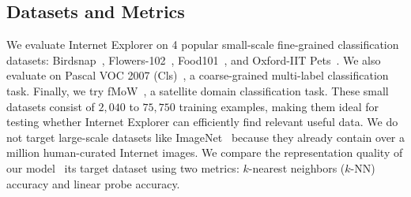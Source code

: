 \subsection{Datasets and Metrics}
We evaluate Internet Explorer on 4 popular small-scale fine-grained classification datasets: Birdsnap~\cite{berg2014birdsnap}, Flowers-102~\cite{nilsback2008automated}, Food101~\cite{bossard2014food}, and Oxford-IIT Pets~\cite{parkhi2012cats}.
We also evaluate on Pascal VOC 2007 (Cls)~\cite{everingham2010pascal}, a coarse-grained multi-label classification task. Finally, we try fMoW~\cite{fmow2018}, a satellite domain classification task. These small datasets consist of $2{,}040$ to $75{,}750$ training examples, making them ideal for testing whether Internet Explorer can efficiently find relevant useful data.
We do not target large-scale datasets like ImageNet~\cite{deng2009imagenet} because they already contain over a million human-curated Internet images.
We compare the representation quality of our model \wrt~its target dataset using two metrics: $k$-nearest neighbors ($k$-NN) accuracy and linear probe accuracy. 



